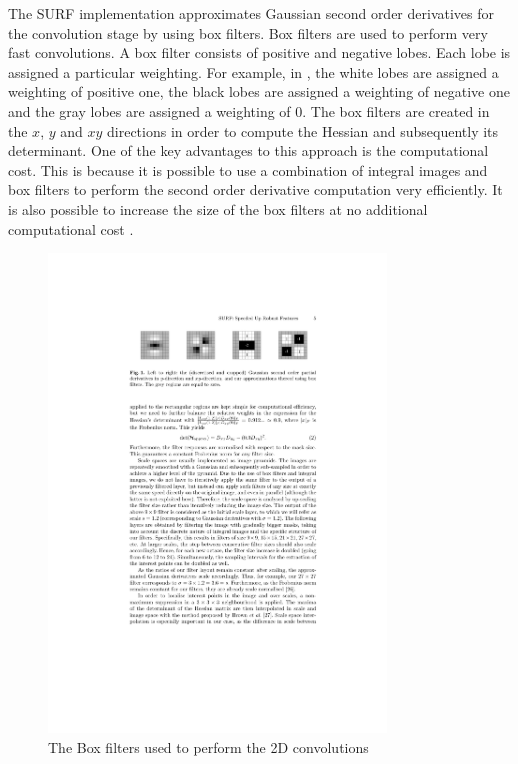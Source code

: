 \documentclass{report}
\begin{document}
The SURF implementation approximates Gaussian second order derivatives for the convolution stage by using box filters. Box filters are used to perform very fast convolutions. A box filter consists of positive and negative lobes. Each lobe is assigned a particular weighting. For example, in  \cite{Bay2008}, the white lobes are assigned a weighting of positive one, the black lobes are assigned a weighting of negative one and the gray lobes are assigned a weighting of 0. The box filters are created in the $x$, $y$ and $xy$ directions in order to compute the Hessian and subsequently its determinant. One of the key advantages to this approach is the computational cost. This is because it is possible to use a combination of integral images and box filters to perform the second order derivative computation very efficiently. It is also possible to increase the size of the box filters at no additional computational cost \cite{Bay2008}.\\

\begin{figure}[h!] 
  \centering
    \includegraphics[width=0.8\textwidth]{../Drawings/methods/SURF2D_BoxFilters.pdf}
    \caption{The Box filters used to perform the 2D convolutions}
    \label{fig:boxFilters}
\end{figure}
\end{document}
